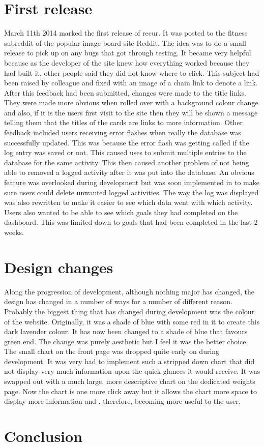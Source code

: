\section{First release}
March 11th 2014 marked the first release of recur. It was posted to the fitness subreddit of the popular image board site Reddit\citep{reddit:2005}. The idea was to do a small release to pick up on any bugs that got through testing. It became very helpful because as the developer of the site knew how everything worked because they had built it, other people said they did not know where to click. This subject had been raised by colleague and fixed with an image of a chain link to denote a link. After this feedback had been submitted, changes were made to the title links. They were made more obvious when rolled over with a background colour change and also, if it is the users first visit to the site then they will be shown a message telling them that the titles of the cards are links to more information. Other feedback included users receiving error flashes when really the database was successfully updated. This was because the error flash was getting called if the log entry was saved or not. This caused uses to submit multiple entries to the database for the same activity. This then caused another problem of not being able to removed a logged activity after it was put into the database. An obvious feature was overlooked during development but was soon implemented in to make sure users could delete unwanted logged activities. The way the log was displayed was also rewritten to make it easier to see which data went with which activity. Users also wanted to be able to see which goals they had completed on the dashboard. This was limited down to goals that had been completed in the last 2 weeks.

\section{Design changes}
Along the progression of development, although nothing major has changed, the design has changed in a number of ways for a number of different reason. Probably the biggest thing that has changed during development was the colour of the website. Originally, it was a shade of blue with some red in it to create this dark lavender colour. It has now been changed to a shade of blue that favours green end. The change was purely aesthetic but I feel it was the better choice. The small chart on the front page was dropped quite early on during development. It was very had to implement such a stripped down chart that did not display very much information upon the quick glances it would receive. It was swapped out with a much large, more descriptive chart on the dedicated weights page. Now the chart is one more click away but it allows the chart more space to display more information and , therefore, becoming more useful to the user.


\section{Conclusion}